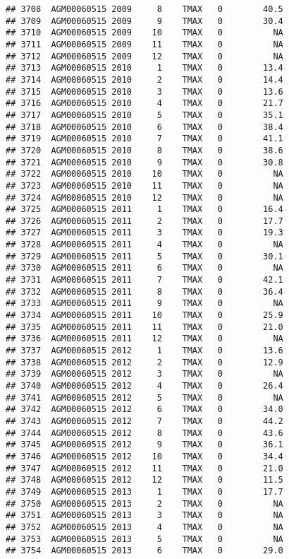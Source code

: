 \documentclass{article}\usepackage[]{graphicx}\usepackage[]{color}
\makeatletter
\newenvironment{kframe}{%
 \def\at@end@of@kframe{}%
 \ifinner\ifhmode%
  \def\at@end@of@kframe{\end{minipage}}%
  \begin{minipage}{\columnwidth}%
 \fi\fi%
 \def\FrameCommand##1{\hskip\@totalleftmargin \hskip-\fboxsep
 \colorbox{shadecolor}{##1}\hskip-\fboxsep
     \hskip-\linewidth \hskip-\@totalleftmargin \hskip\columnwidth}%
 \MakeFramed {\advance\hsize-\width
   \@totalleftmargin\z@ \linewidth\hsize
   \@setminipage}}%
 {\par\unskip\endMakeFramed%
 \at@end@of@kframe}
\newenvironment{knitrout}{}{} %
\makeatother
\begin{document}
\begin{knitrout}
\begin{kframe}
\begin{verbatim}
## 3708  AGM00060515 2009     8    TMAX   0        40.5
## 3709  AGM00060515 2009     9    TMAX   0        30.4
## 3710  AGM00060515 2009    10    TMAX   0          NA
## 3711  AGM00060515 2009    11    TMAX   0          NA
## 3712  AGM00060515 2009    12    TMAX   0          NA
## 3713  AGM00060515 2010     1    TMAX   0        13.4
## 3714  AGM00060515 2010     2    TMAX   0        14.4
## 3715  AGM00060515 2010     3    TMAX   0        13.6
## 3716  AGM00060515 2010     4    TMAX   0        21.7
## 3717  AGM00060515 2010     5    TMAX   0        35.1
## 3718  AGM00060515 2010     6    TMAX   0        38.4
## 3719  AGM00060515 2010     7    TMAX   0        41.1
## 3720  AGM00060515 2010     8    TMAX   0        38.6
## 3721  AGM00060515 2010     9    TMAX   0        30.8
## 3722  AGM00060515 2010    10    TMAX   0          NA
## 3723  AGM00060515 2010    11    TMAX   0          NA
## 3724  AGM00060515 2010    12    TMAX   0          NA
## 3725  AGM00060515 2011     1    TMAX   0        16.4
## 3726  AGM00060515 2011     2    TMAX   0        17.7
## 3727  AGM00060515 2011     3    TMAX   0        19.3
## 3728  AGM00060515 2011     4    TMAX   0          NA
## 3729  AGM00060515 2011     5    TMAX   0        30.1
## 3730  AGM00060515 2011     6    TMAX   0          NA
## 3731  AGM00060515 2011     7    TMAX   0        42.1
## 3732  AGM00060515 2011     8    TMAX   0        36.4
## 3733  AGM00060515 2011     9    TMAX   0          NA
## 3734  AGM00060515 2011    10    TMAX   0        25.9
## 3735  AGM00060515 2011    11    TMAX   0        21.0
## 3736  AGM00060515 2011    12    TMAX   0          NA
## 3737  AGM00060515 2012     1    TMAX   0        13.6
## 3738  AGM00060515 2012     2    TMAX   0        12.9
## 3739  AGM00060515 2012     3    TMAX   0          NA
## 3740  AGM00060515 2012     4    TMAX   0        26.4
## 3741  AGM00060515 2012     5    TMAX   0          NA
## 3742  AGM00060515 2012     6    TMAX   0        34.0
## 3743  AGM00060515 2012     7    TMAX   0        44.2
## 3744  AGM00060515 2012     8    TMAX   0        43.6
## 3745  AGM00060515 2012     9    TMAX   0        36.1
## 3746  AGM00060515 2012    10    TMAX   0        34.4
## 3747  AGM00060515 2012    11    TMAX   0        21.0
## 3748  AGM00060515 2012    12    TMAX   0        11.5
## 3749  AGM00060515 2013     1    TMAX   0        17.7
## 3750  AGM00060515 2013     2    TMAX   0          NA
## 3751  AGM00060515 2013     3    TMAX   0          NA
## 3752  AGM00060515 2013     4    TMAX   0          NA
## 3753  AGM00060515 2013     5    TMAX   0          NA
## 3754  AGM00060515 2013     6    TMAX   0        29.0

\end{verbatim}
\end{kframe}
\end{knitrout}
\end{document}
